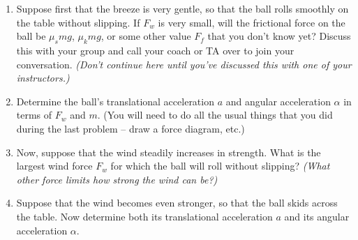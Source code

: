 \documentclass[12pt]{article}
\begin{document}
\begin{enumerate}

\item Suppose first that the breeze is very gentle, so that the ball rolls smoothly on the table without slipping. If $F_w$ is very small, will the frictional force on the ball be $\mu_s mg$, $\mu_k mg$, or some other value $F_f$ that you don't know yet? Discuss this with your group and call your coach or TA over to join your conversation. {\it (Don't continue here until you've discussed this with one of your instructors.)}

\bigskip

\item Determine the ball's translational acceleration $a$ and angular acceleration $\alpha$ in terms of $F_w$ and $m$. (You will need to do all the usual things that you did during the last problem -- draw a force diagram, etc.) 

\newpage

\item Now, suppose that the wind steadily increases in strength. What is the largest wind force $F_w$ for which the ball will roll without slipping? {\it (What other force limits how strong the wind can be?)}


\vspace{4.5in}

\item Suppose that the wind becomes even stronger, so that the ball skids across the table. Now determine both its translational acceleration $a$ and its angular acceleration $\alpha$.
\end{enumerate}


\end{document}
